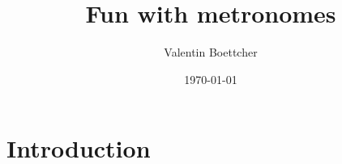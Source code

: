 \documentclass[10pt,aps,pra,twocolumn,nofootinbib,superscriptaddress,floatfix]{revtex4-2}
\begin{document}
\title{Fun with metronomes}

\author{Valentin Boettcher}

\date{\today}


\maketitle

\section{Introduction}
\label{sec:introduction}
\end{document}
